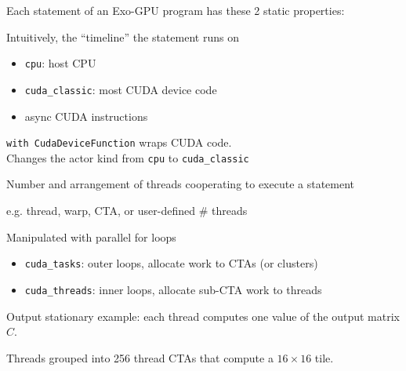 \begin{minipage}[t]{0.48\textwidth}\fixminipage

Each statement of an Exo-GPU program has these 2 static properties:


Intuitively, the ``timeline'' the statement runs on
\begin{itemize}
  \item \texttt{cpu}: host CPU
  \item \texttt{cuda\_classic}: most CUDA device code
  \item async CUDA instructions
\end{itemize}
\texttt{with CudaDeviceFunction} wraps CUDA code.\\
Changes the actor kind from \texttt{cpu} to \texttt{cuda\_classic}


Number and arrangement of threads cooperating to execute a statement

e.g. thread, warp, CTA, or user-defined \# threads

Manipulated with parallel for loops

\begin{itemize}
  \item \texttt{cuda\_tasks}: outer loops, allocate work to CTAs (or clusters)
  \item \texttt{cuda\_threads}: inner loops, allocate sub-CTA work to threads
\end{itemize}
\end{minipage}

\newpage
{}

Output stationary example: each thread computes one value of the output matrix $C$.

Threads grouped into 256 thread CTAs that compute a $16 \times 16$ tile.


\newpage
{}



\newpage
{}



\newpage
{}



